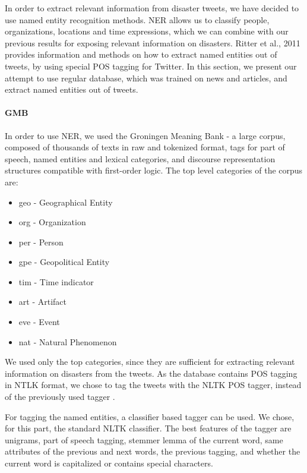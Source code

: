 \documentclass[letterpaper,twocolumn,10pt]{article}
\begin{document}
In order to extract relevant information from disaster tweets, we have decided to use named entity recognition methods. NER allows us to classify people, organizations, locations and time expressions, which we can combine with our previous results for exposing relevant information on disasters. Ritter et al., 2011 \cite{Ritter11} provides information and methods on how to extract named entities out of tweets, by using special POS tagging for Twitter. In this section, we present our attempt to use regular database, which was trained on news and articles, and extract named entities out of tweets.

\paragraph{GMB} In order to use NER, we used the Groningen Meaning Bank - a large corpus, composed of thousands of texts in raw and tokenized format, tags for part of speech, named entities and lexical categories, and discourse representation structures compatible with first-order logic. The top level categories of the corpus are:
\begin{itemize}[noitemsep, nolistsep]
	\item geo - Geographical Entity
	\item org - Organization
	\item per - Person
	\item gpe - Geopolitical Entity
	\item tim - Time indicator
	\item art - Artifact
	\item eve - Event
	\item nat - Natural Phenomenon
\end{itemize}
We used only the top categories, since they are sufficient for extracting relevant information on disasters from the tweets. As the database contains POS tagging in NTLK format, we chose to tag the tweets with the NLTK POS tagger, instead of the previously used tagger \cite{ark-twokenize-py}.

For tagging the named entities, a classifier based tagger can be used. We chose, for this part, the standard NLTK classifier. The best features of the tagger are unigrams, part of speech tagging, stemmer lemma of the current word, same attributes of the previous and next words, the previous tagging, and whether the current word is capitalized or contains special characters.
\end{document}
